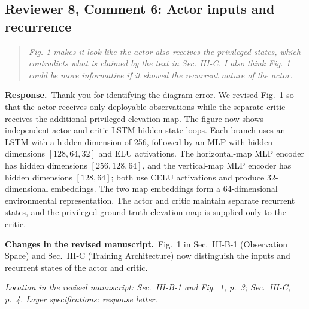 \documentclass[11pt]{article}
\newenvironment{reviewcomment}{\begin{quote}\color{reviewblue}\itshape}{\end{quote}}
\newcommand{\Response}{\par\noindent\textbf{Response.}\ }
\newcommand{\Changes}{\par\noindent\textbf{Changes in the revised manuscript.}\ }
\newcommand{\Location}[1]{\par\noindent\textit{Location in the revised manuscript: #1}}
\begin{document}
\subsection*{Reviewer 8, Comment 6: Actor inputs and recurrence}
\begin{reviewcomment}
Fig. 1 makes it look like the actor also receives the privileged states, which contradicts what is claimed by the text in Sec. III-C. I also think Fig. 1 could be more informative if it showed the recurrent nature of the actor.
\end{reviewcomment}
\Response Thank you for identifying the diagram error. We revised Fig.~1 so that the actor receives only deployable observations while the separate critic receives the additional privileged elevation map. The figure now shows independent actor and critic LSTM hidden-state loops. Each branch uses an LSTM with a hidden dimension of 256, followed by an MLP with hidden dimensions $[128,64,32]$ and ELU activations. The horizontal-map MLP encoder has hidden dimensions $[256,128,64]$, and the vertical-map MLP encoder has hidden dimensions $[128,64]$; both use CELU activations and produce 32-dimensional embeddings. The two map embeddings form a 64-dimensional environmental representation. The actor and critic maintain separate recurrent states, and the privileged ground-truth elevation map is supplied only to the critic.
\Changes Fig.~1 in Sec.~III-B-1 (Observation Space) and Sec.~III-C (Training Architecture) now distinguish the inputs and recurrent states of the actor and critic.
\Location{Sec.~III-B-1 and Fig.~1, p.~3; Sec.~III-C, p.~4. Layer specifications: response letter.}
\end{document}
